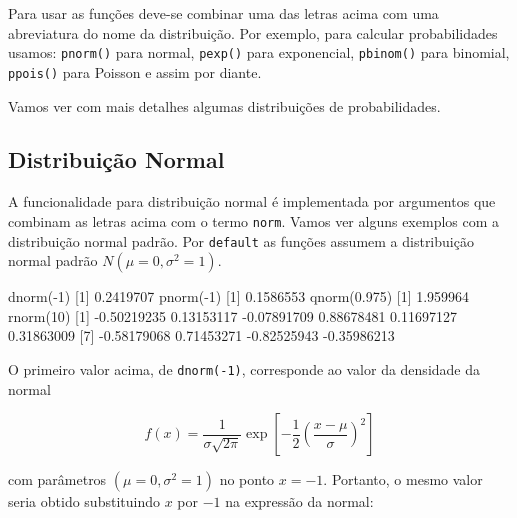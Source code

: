 \documentclass[
  10pt,
  a4paper]{book}
\newenvironment{Shaded}{\begin{snugshade}}{\end{snugshade}}
\newcommand{\DecValTok}[1]{\textcolor[rgb]{0.00,0.00,0.81}{#1}}
\newcommand{\FloatTok}[1]{\textcolor[rgb]{0.00,0.00,0.81}{#1}}
\newcommand{\FunctionTok}[1]{\textcolor[rgb]{0.00,0.00,0.00}{#1}}
\newcommand{\NormalTok}[1]{#1}
\newcommand{\SpecialCharTok}[1]{\textcolor[rgb]{0.00,0.00,0.00}{#1}}
\begin{document}
Para usar as funções deve-se combinar uma das letras acima com uma
abreviatura do nome da distribuição. Por exemplo, para calcular
probabilidades usamos: \texttt{pnorm()} para normal, \texttt{pexp()} para exponencial,
\texttt{pbinom()} para binomial, \texttt{ppois()} para Poisson e assim por diante.

Vamos ver com mais detalhes algumas distribuições de probabilidades.

\hypertarget{distribuiuxe7uxe3o-normal}{%
\subsection{Distribuição Normal}\label{distribuiuxe7uxe3o-normal}}

A funcionalidade para distribuição normal é implementada por argumentos
que combinam as letras acima com o termo \texttt{norm}. Vamos ver alguns
exemplos com a distribuição normal padrão. Por \texttt{default} as funções
assumem a distribuição normal padrão \(N(\mu=0, \sigma^2=1)\).

\begin{Shaded}
\begin{Highlighting}[]
\FunctionTok{dnorm}\NormalTok{(}\SpecialCharTok{{-}}\DecValTok{1}\NormalTok{)}
\NormalTok{[}\DecValTok{1}\NormalTok{] }\FloatTok{0.2419707}
\FunctionTok{pnorm}\NormalTok{(}\SpecialCharTok{{-}}\DecValTok{1}\NormalTok{)}
\NormalTok{[}\DecValTok{1}\NormalTok{] }\FloatTok{0.1586553}
\FunctionTok{qnorm}\NormalTok{(}\FloatTok{0.975}\NormalTok{)}
\NormalTok{[}\DecValTok{1}\NormalTok{] }\FloatTok{1.959964}
\FunctionTok{rnorm}\NormalTok{(}\DecValTok{10}\NormalTok{)}
\NormalTok{ [}\DecValTok{1}\NormalTok{] }\SpecialCharTok{{-}}\FloatTok{0.50219235}  \FloatTok{0.13153117} \SpecialCharTok{{-}}\FloatTok{0.07891709}  \FloatTok{0.88678481}  \FloatTok{0.11697127}  \FloatTok{0.31863009}
\NormalTok{ [}\DecValTok{7}\NormalTok{] }\SpecialCharTok{{-}}\FloatTok{0.58179068}  \FloatTok{0.71453271} \SpecialCharTok{{-}}\FloatTok{0.82525943} \SpecialCharTok{{-}}\FloatTok{0.35986213}
\end{Highlighting}
\end{Shaded}

O primeiro valor acima, de \texttt{dnorm(-1)}, corresponde ao valor da densidade
da normal

\[
f(x) = \frac{1}{\sigma\sqrt{2 \pi}}\exp \left[ -\frac{1}{2}
    \left( \frac{x - \mu}{\sigma} \right)^2 \right]
\]

com parâmetros \((\mu=0, \sigma^2=1)\) no ponto \(x = -1\). Portanto, o mesmo
valor seria obtido substituindo \(x\) por \(-1\) na expressão da normal:
\end{document}
